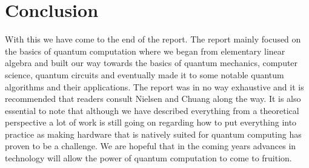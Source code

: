 \chapter{Conclusion}
With this we have come to the end of the report. The report mainly focused on the basics of quantum computation where we began from elementary linear algebra and built our way towards the basics of quantum mechanics, computer science, quantum circuits and eventually made it to some notable quantum algorithms and their applications. The report was in no way exhaustive and it is recommended that readers consult Nielsen and Chuang along the way. It is also essential to note that although we have described everything from a theoretical perspective a lot of work is still going on regarding how to put everything into practice as making hardware that is natively suited for quantum computing has proven to be a challenge. We are hopeful that in the coming years advances in technology will allow the power of quantum computation to come to fruition.